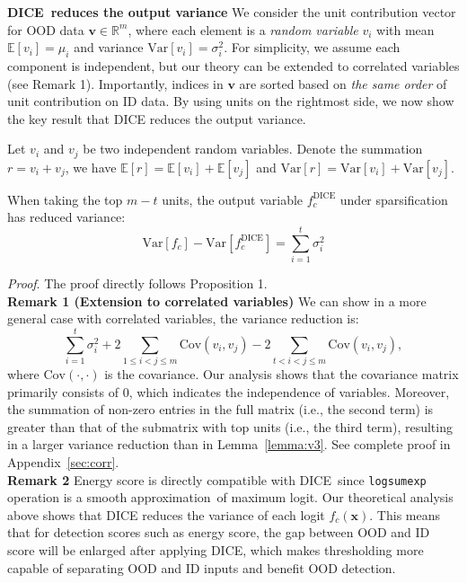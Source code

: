 \documentclass[runningheads]{llncs}
\newcommand{\methodAbbr}{DICE~}
\def\*#1{\mathbf{#1}}
\begin{document}
\noindent \textbf{\methodAbbr reduces the output variance} We consider the unit contribution vector for OOD data $\*v \in \mathbb{R}^m$, where each element is a \emph{random variable} $v_i$ with  mean $\mathbb{E}[v_i] = \mu_i$ and variance $\mathrm{Var}[v_i] = \sigma_i^2$.
For simplicity, we assume each component is independent, but our theory can be extended to correlated variables (see Remark 1). 
Importantly, {indices in $\*v$ are sorted based on \emph{the same order} of unit contribution on ID data}. By using units on the rightmost side, we now show the key result that DICE reduces the output variance.


\begin{proposition}
\label{prop:sum_gaussian}
Let $v_i$ and $v_j$ be two independent {random variables}. Denote the summation $r=v_i + v_j$, we have $\mathbb{E}[r] = \mathbb{E}[v_i] + \mathbb{E}[v_j]$ and $\mathrm{Var}[r] = \mathrm{Var}[v_i] + \mathrm{Var}[v_j]$.
\end{proposition}


\begin{lemma}
\label{lemma:v3}
When taking the top $m-t$ units, the output variable $f_c^\text{DICE}$ under sparsification has reduced variance:
$$\mathrm{Var} [f_c] - \mathrm{Var} [f_c^\text{DICE}] = \sum_{i=1}^{t} \sigma_i^2 $$
\end{lemma}
\noindent \textit{Proof}. The proof directly follows Proposition 1. \\


\noindent \textbf{Remark 1 (Extension to correlated variables)} We can show in a more general case with correlated variables, the variance reduction is:  $$\sum_{i=1}^{t} \sigma_i^2  + 2 \sum_{1\le i < j \le m} \mathrm{Cov}(v_i, v_j) - 2\sum_{t< i <j \le m} \mathrm{Cov}(v_i, v_j), $$
where $\mathrm{Cov}(\cdot ,\cdot )$ is the covariance. Our analysis shows that the covariance matrix primarily consists of 0, which indicates the independence of variables. Moreover, the summation of non-zero entries in the full matrix (i.e., the second term) is greater than that of the submatrix with top units (i.e., the third term), resulting in a larger variance reduction than in Lemma~\ref{lemma:v3}. 
See complete proof in Appendix~\ref{sec:corr}. \\

\noindent \textbf{Remark 2} 
 Energy score is directly compatible with \methodAbbr since \texttt{logsumexp} operation is a smooth approximation~of maximum logit. Our theoretical analysis above shows that DICE reduces the variance of each logit $f_c(\*x)$. 
This means that for detection scores such as energy score, the gap between OOD and ID score will be enlarged after applying DICE, which makes thresholding more capable of separating OOD and ID inputs and benefit OOD detection. \\
\end{document}
